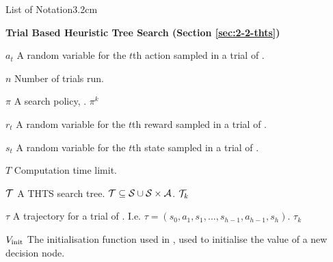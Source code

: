 \begin{mclistof}{List of Notation}{3.2cm}
    \item[\Large\textbf{Trial Based Heuristic Tree Search (Section \ref{sec:2-2-thts})}\hfill\hfill]
    \item[$a_t$] 
        A random variable for the $t$th action sampled in a trial of \thtspp.
    \item[$n$] 
        Number of trials run.
    \item[$\pi$]
        A search policy, .  $\pi^k$
    \item[$r_t$] 
        A random variable for the $t$th reward sampled in a trial of \thtspp.
    \item[$s_t$] 
        A random variable for the $t$th state sampled in a trial of \thtspp.
    \item[$T$] 
        Computation time limit.
    \item[$\mathcal{T}$] 
        A THTS search tree.  $\mathcal{T}\subseteq \mathcal{S} \cup \mathcal{S}\times\mathcal{A}$.  $\mathcal{T}_k$
    \item[$\tau$] 
        A trajectory for a trial of \thtspp. I.e. $\tau=(s_0,a_1,s_1,...,s_{h-1},a_{h-1},s_h)$.  $\tau_k$
    \item[$V_{\text{init}}$]
        The initialisation function used in \thtspp, used to initialise the value of a new decision node.

\end{mclistof} 

